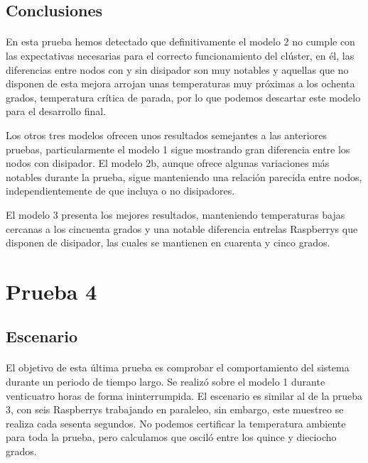 \subsection{Conclusiones}
\paragraph{}
En esta prueba hemos detectado que definitivamente el modelo 2 no cumple con las expectativas necesarias para el correcto funcionamiento del clúster, en él, las diferencias entre nodos con y sin disipador son muy notables y aquellas que no disponen de esta mejora arrojan unas temperaturas muy próximas a los ochenta grados, temperatura crítica de parada, por lo que podemos descartar este modelo para el desarrollo final.

Los otros tres modelos ofrecen unos resultados semejantes a las anteriores pruebas, particularmente el modelo 1 sigue mostrando gran diferencia entre los nodos con disipador. El modelo 2b, aunque ofrece algunas variaciones más notables durante la prueba, sigue manteniendo una relación parecida entre nodos, independientemente de que incluya o no disipadores.

El modelo 3 presenta los mejores resultados, manteniendo temperaturas bajas cercanas a los cincuenta grados y una notable diferencia entrelas Raspberrys que disponen de disipador, las cuales se mantienen en cuarenta y cinco grados. 

\section{Prueba 4}

\label{makereference5.6}
\subsection{Escenario}
\paragraph{}

El objetivo de esta última prueba es comprobar el comportamiento del sistema durante un periodo de tiempo largo. Se realizó sobre el modelo 1 durante venticuatro horas de forma ininterrumpida. El escenario es similar al de la prueba 3, con seis Raspberrys trabajando en paraleleo,  sin embargo, este muestreo se realiza cada sesenta segundos. No podemos certificar la temperatura ambiente para toda la prueba, pero calculamos que osciló entre los quince y dieciocho grados.

